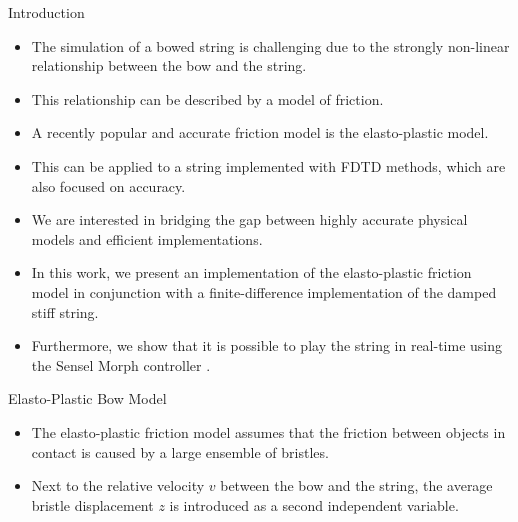 \documentclass[a0paper,portrait]{baposter}
\begin{document}
\begin{poster}

\begin{posterbox}[name=intro,column=0,row=0]{Introduction}
\begin{itemize}
    \item The simulation of a bowed string is challenging due to the strongly non-linear relationship between the bow and the string.
    \item This relationship can be described by a model of friction.
    \item A recently popular and accurate friction model is the elasto-plastic model.
    \item This can be applied to a string implemented with FDTD methods, which are also focused on accuracy. 
    \item We are interested in bridging the gap between highly accurate physical models and efficient implementations. \item In this work, we present an implementation of the elasto-plastic friction model in conjunction with a finite-difference implementation of the damped stiff string. 
    \item Furthermore, we show that it is possible to play the string in real-time using the Sensel Morph controller \cite{Sensel2019}.
\end{itemize}
\end{posterbox}

\begin{posterbox}[name=elasto,column=0,below=intro]{Elasto-Plastic Bow Model}
\begin{itemize}

    \item The elasto-plastic friction model assumes that the friction between objects in contact is caused by a large ensemble of bristles. 
    \item Next to the relative velocity $v$ between the bow and the string, the average bristle displacement $z$ is introduced as a second independent variable. 
\end{itemize}
\begin{center}
\end{center}
\end{posterbox}
\end{poster}
\end{document}
